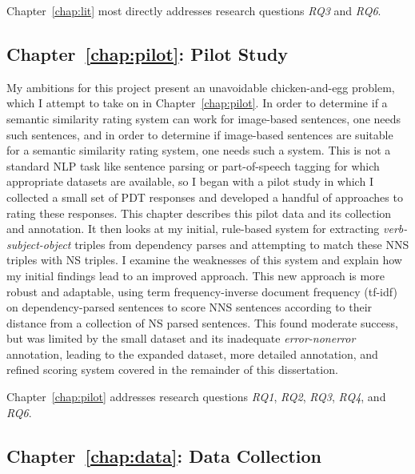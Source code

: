 Chapter~\ref{chap:lit} most directly addresses research questions \textit{RQ3} and \textit{RQ6}.

\subsection{Chapter~\ref{chap:pilot}: Pilot Study}

My ambitions for this project present an unavoidable chicken-and-egg problem, which I attempt to take on in Chapter~\ref{chap:pilot}. In order to determine if a semantic similarity rating system can work for image-based sentences, one needs such sentences, and in order to determine if image-based sentences are suitable for a semantic similarity rating system, one needs such a system. This is not a standard NLP task like sentence parsing or part-of-speech tagging for which appropriate datasets are available, so I began with a pilot study in which I collected a small set of PDT responses and developed a handful of approaches to rating these responses. This chapter describes this pilot data and its collection and annotation. It then looks at my initial, rule-based system for extracting \textit{verb-subject-object} triples from dependency parses and attempting to match these NNS triples with NS triples. I examine the weaknesses of this system and explain how my initial findings lead to an improved approach. This new approach is more robust and adaptable, using term frequency-inverse document frequency (tf-idf) on dependency-parsed sentences to score NNS sentences according to their distance from a collection of NS parsed sentences. This found moderate success, but was limited by the small dataset and its inadequate \textit{error-nonerror} annotation, leading to the expanded dataset, more detailed annotation, and refined scoring system covered in the remainder of this dissertation. 

Chapter~\ref{chap:pilot} addresses research questions \textit{RQ1}, \textit{RQ2}, \textit{RQ3}, \textit{RQ4}, and \textit{RQ6}.


\subsection{Chapter~\ref{chap:data}: Data Collection}


